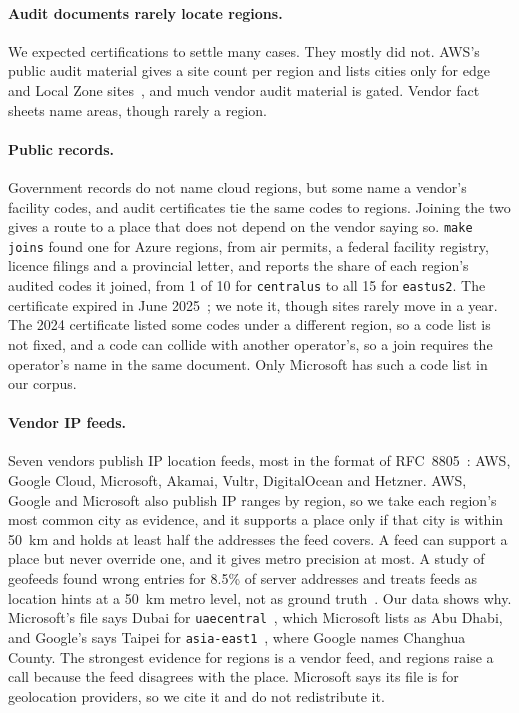 \documentclass[10pt,twocolumn]{article}
\newcommand{\code}[1]{\texttt{#1}}
\begin{document}
\begin{table}[tp]
\centering
\small

\caption{Strongest evidence grade per region, by vendor.}
\label{tab:grades}
\end{table}

\paragraph{Audit documents rarely locate regions.} We expected certifications to settle many cases. They mostly did not. AWS's public audit material gives a site count per region and lists cities only for edge and Local Zone sites~\citep{aws_soc3}, and much vendor audit material is gated. Vendor fact sheets name areas, though rarely a region.

\paragraph{Public records.} Government records do not name cloud regions, but some name a vendor's facility codes, and audit certificates tie the same codes to regions. Joining the two gives a route to a place that does not depend on the vendor saying so. \code{make joins} found one for \gradePublicRecord{} Azure regions, from air permits, a federal facility registry, licence filings and a provincial letter, and reports the share of each region's audited codes it joined, from 1 of 10 for \code{centralus} to all 15 for \code{eastus2}. The certificate expired in June 2025~\citep{gsma_microsoft_2024}; we note it, though sites rarely move in a year. The 2024 certificate listed some codes under a different region, so a code list is not fixed, and a code can collide with another operator's, so a join requires the operator's name in the same document. Only Microsoft has such a code list in our corpus.

\paragraph{Vendor IP feeds.} Seven vendors publish IP location feeds, most in the format of RFC~8805~\citep{rfc8805}: AWS, Google Cloud, Microsoft, Akamai, Vultr, DigitalOcean and Hetzner. AWS, Google and Microsoft also publish IP ranges by region, so we take each region's most common city as evidence, and it supports a place only if that city is within 50~km and holds at least half the addresses the feed covers. A feed can support a place but never override one, and it gives metro precision at most. A study of geofeeds found wrong entries for 8.5\% of server addresses and treats feeds as location hints at a 50~km metro level, not as ground truth~\citep{livadariu2024geofeeds}. Our data shows why. Microsoft's file says Dubai for \code{uaecentral}~\citep{azure_geofeed}, which Microsoft lists as Abu Dhabi, and Google's says Taipei for \code{asia-east1}~\citep{gcp_geofeed}, where Google names Changhua County. The strongest evidence for \feedRegions{} regions is a vendor feed, and \feedConflicts{} regions raise a call because the feed disagrees with the place. Microsoft says its file is for geolocation providers, so we cite it and do not redistribute it.
\end{document}
